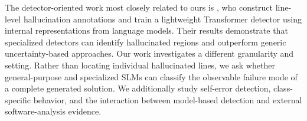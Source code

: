 The detector-oriented work most closely related to ours is \citet{andriushchenko-etal-2026-efficient}, who construct line-level hallucination annotations and train a lightweight Transformer detector using internal representations from language models. Their results demonstrate that specialized detectors can identify hallucinated regions and outperform generic uncertainty-based approaches. Our work investigates a different granularity and setting. Rather than locating individual hallucinated lines, we ask whether general-purpose and specialized SLMs can classify the observable failure mode of a complete generated solution. We additionally study self-error detection, class-specific behavior, and the interaction between model-based detection and external software-analysis evidence.

